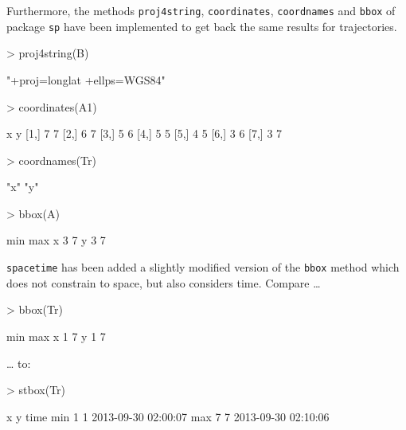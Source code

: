 \documentclass{article}
\newcommand{\code}[1]{{\tt #1}}
\begin{document}
Furthermore, the methods \code{proj4string}, \code{coordinates}, \code{coordnames} and \code{bbox} of package \code{sp} \cite{pebesma05, bivand13} have been implemented to get back the same results for trajectories.

\begin{Schunk}
\begin{Sinput}
> proj4string(B)
\end{Sinput}
\begin{Soutput}
[1] "+proj=longlat +ellps=WGS84"
\end{Soutput}
\begin{Sinput}
> coordinates(A1)
\end{Sinput}
\begin{Soutput}
     x y
[1,] 7 7
[2,] 6 7
[3,] 5 6
[4,] 5 5
[5,] 4 5
[6,] 3 6
[7,] 3 7
\end{Soutput}
\begin{Sinput}
> coordnames(Tr)
\end{Sinput}
\begin{Soutput}
[1] "x" "y"
\end{Soutput}
\begin{Sinput}
> bbox(A)
\end{Sinput}
\begin{Soutput}
  min max
x   3   7
y   3   7
\end{Soutput}
\end{Schunk}

\code{spacetime} has been added a slightly modified version of the \code{bbox} method which does not constrain to space, but also considers time. Compare \dots

\begin{Schunk}
\begin{Sinput}
> bbox(Tr)
\end{Sinput}
\begin{Soutput}
  min max
x   1   7
y   1   7
\end{Soutput}
\end{Schunk}

\dots{} to:

\begin{Schunk}
\begin{Sinput}
> stbox(Tr)
\end{Sinput}
\begin{Soutput}
    x y                time
min 1 1 2013-09-30 02:00:07
max 7 7 2013-09-30 02:10:06
\end{Soutput}
\end{Schunk}
\end{document}
